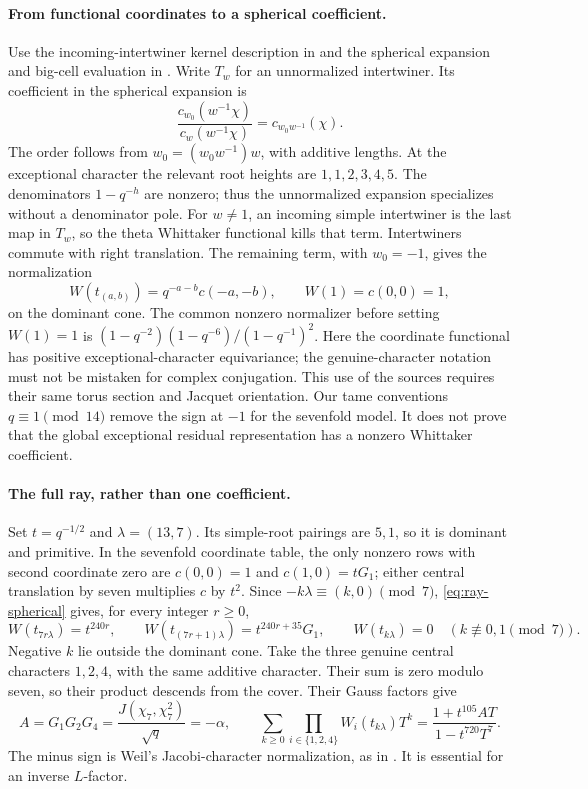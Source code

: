 \documentclass[11pt]{article}
\begin{document}
\paragraph{From functional coordinates to a spherical coefficient.}
Use the incoming-intertwiner kernel description in \cite[Proposition
3.4]{Gao} and the spherical expansion and big-cell evaluation in
\cite[Proposition 5.3 and Lemma 6.3]{McNamara}. Write \(T_w\) for an
unnormalized intertwiner. Its coefficient in the spherical expansion is
\[
 \frac{c_{w_0}(w^{-1}\chi)}{c_w(w^{-1}\chi)}
       =c_{w_0w^{-1}}(\chi).
\]
The order follows from \(w_0=(w_0w^{-1})w\), with additive lengths.
At the exceptional character the relevant root heights are
\(1,1,2,3,4,5\). The denominators \(1-q^{-h}\) are nonzero; thus the
unnormalized expansion specializes without a denominator pole.
For \(w\ne1\), an incoming simple intertwiner is the last map in
\(T_w\), so the theta Whittaker functional kills that term. Intertwiners
commute with right translation. The remaining term, with \(w_0=-1\),
gives the normalization
\[
 W(t_{(a,b)})=q^{-a-b}c(-a,-b),\qquad W(1)=c(0,0)=1,
 \tag{S1}\label{eq:ray-spherical}
\]
on the dominant cone. The common nonzero normalizer before setting
\(W(1)=1\) is
\((1-q^{-2})(1-q^{-6})/(1-q^{-1})^2\).
Here the coordinate functional has positive exceptional-character
equivariance; the genuine-character notation must not be mistaken for
complex conjugation. This use of the sources requires their same torus
section and Jacquet orientation. Our tame conventions \(q\equiv1
\pmod {14}\) remove the sign at \(-1\) for the sevenfold model.
It does not prove that the global exceptional residual representation
has a nonzero Whittaker coefficient.

\paragraph{The full ray, rather than one coefficient.}
Set \(t=q^{-1/2}\) and \(\lambda=(13,7)\). Its simple-root pairings
are \(5,1\), so it is dominant and primitive. In the sevenfold
coordinate table, the only nonzero rows with second coordinate zero
are \(c(0,0)=1\) and \(c(1,0)=tG_1\); either central translation by
seven multiplies \(c\) by \(t^2\).
Since \(-k\lambda\equiv(k,0)\pmod7\), \eqref{eq:ray-spherical} gives,
for every integer \(r\ge0\),
\[
 W(t_{7r\lambda})=t^{240r},\qquad
 W(t_{(7r+1)\lambda})=t^{240r+35}G_1,\qquad
 W(t_{k\lambda})=0\quad(k\not\equiv0,1\pmod7).
 \tag{S2}\label{eq:septic-ray-rows}
\]
Negative \(k\) lie outside the dominant cone.
Take the three genuine central characters \(1,2,4\), with the same
additive character. Their sum is zero modulo seven, so their product
descends from the cover. Their Gauss factors give
\[
 A=G_1G_2G_4=\frac{J(\chi_7,\chi_7^2)}{\sqrt q}=-\alpha,
 \qquad
 \sum_{k\ge0}\prod_{i\in\{1,2,4\}}W_i(t_{k\lambda})T^k
       =\frac{1+t^{105}AT}{1-t^{720}T^7}.
 \tag{S3}
\]
The minus sign is Weil's Jacobi-character normalization, as in
\cite{Watkins}. It is essential for an inverse \(L\)-factor.
\end{document}
